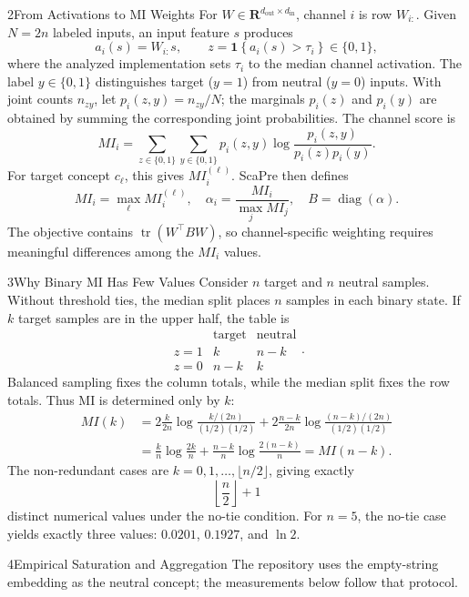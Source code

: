 \documentclass[final]{beamer}
\newlength{\colwidth}
\newcommand{\blocktext}{\RaggedRight\setlength{\parindent}{0pt}\noindent}
\begin{document}
\begin{frame}[t]
\begin{columns}[t,totalwidth=\paperwidth]
\begin{column}{\colwidth}
\begin{block}{2\quad From Activations to MI Weights}
For $W\in\mathbf{R}^{d_{\mathrm{out}}\times d_{\mathrm{in}}}$, channel $i$ is row $W_{i:}$. Given $N=2n$ labeled inputs, an input feature $s$ produces
\[
a_i(s)=W_{i:}s,
\qquad
z=\mathbf{1}\!\left\{a_i(s)>\tau_i\right\}\in\{0,1\},
\]
where the analyzed implementation sets $\tau_i$ to the median channel activation. The label $y\in\{0,1\}$ distinguishes target ($y=1$) from neutral ($y=0$) inputs. With joint counts $n_{zy}$,
let $p_i(z,y)=n_{zy}/N$; the marginals $p_i(z)$ and $p_i(y)$ are obtained by summing the corresponding joint probabilities.
The channel score is
\[
MI_i=\sum_{z\in\{0,1\}}\sum_{y\in\{0,1\}}
p_i(z,y)\log\frac{p_i(z,y)}{p_i(z)p_i(y)}.
\]
For target concept $c_\ell$, this gives $MI_i^{(\ell)}$. ScaPre then defines
\[
MI_i=\max_\ell MI_i^{(\ell)},
\quad
\alpha_i=\frac{MI_i}{\max_j MI_j},
\quad
B=\operatorname{diag}(\alpha).
\]
The objective contains $\operatorname{tr}(W^\top B W)$, so channel-specific weighting requires meaningful differences among the $MI_i$ values.
\end{block}

\begin{block}{3\quad Why Binary MI Has Few Values}
\blocktext
Consider $n$ target and $n$ neutral samples. Without threshold ties, the median split places $n$ samples in each binary state. If $k$ target samples are in the upper half, the table is
\[
\begin{array}{c|cc}
 & \text{target} & \text{neutral} \\ \hline
z=1 & k & n-k \\
z=0 & n-k & k
\end{array}.
\]
Balanced sampling fixes the column totals, while the median split fixes the row totals. Thus MI is determined only by $k$:
\[
\begin{aligned}
MI(k)
&=2\frac{k}{2n}\log\frac{k/(2n)}{(1/2)(1/2)}
 +2\frac{n-k}{2n}\log\frac{(n-k)/(2n)}{(1/2)(1/2)}\\
&=\frac{k}{n}\log\frac{2k}{n}
 +\frac{n-k}{n}\log\frac{2(n-k)}{n}
 =MI(n-k).
\end{aligned}
\]
The non-redundant cases are $k=0,1,\ldots,\lfloor n/2\rfloor$, giving exactly
\[
\boxed{\left\lfloor\frac n2\right\rfloor+1}
\]
distinct numerical values under the no-tie condition. For $n=5$, the no-tie case yields exactly three values: $0.0201$, $0.1927$, and $\ln2$.

\end{block}

\begin{block}{4\quad Empirical Saturation and Aggregation}
\blocktext
The repository uses the empty-string embedding as the neutral concept; the measurements below follow that protocol.


\end{block}
\end{column}
\end{columns}
\end{frame}
\end{document}
